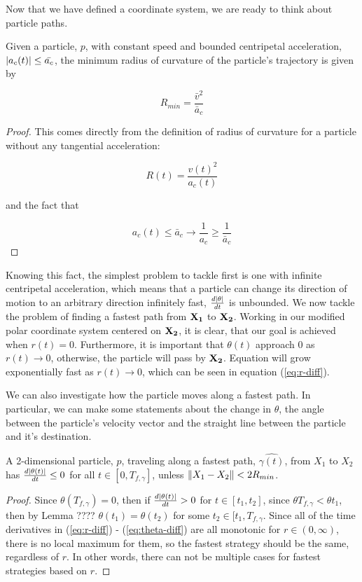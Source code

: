 Now that we have defined a coordinate system, we are ready to think about particle paths.

\begin{lemma}
  Given a particle, $p$, with constant speed and bounded centripetal acceleration, $\abs{a_c(t)} \le \bar{a_c}$, the minimum radius of curvature of the particle's trajectory is given by

  \begin{equation}
    R_{min} = \frac{\bar{v}^2}{\bar{a}_c}
  \end{equation}
  \end{lemma}

\begin{proof}
This comes directly from the definition of radius of curvature for a particle without any tangential acceleration:

\[
  R(t) = \frac{v(t)^2}{a_c(t)}
\]

and the fact that 

\[
  a_c(t) \le \bar{a}_c \to \frac{1}{a_c} \ge \frac{1}{\bar{a}_c}
\]
\end{proof}

Knowing this fact, the simplest problem to tackle first is one with infinite centripetal acceleration, which means that a particle can change its direction of motion to an arbitrary direction infinitely fast, $\frac{d\abs{\theta}}{dt}$ is unbounded. We now tackle the problem of finding a fastest path from $\mathbf{X_1}$ to $\mathbf{X_2}$. Working in our modified polar coordinate system centered on $\mathbf{X_2}$, it is clear, that our goal is achieved when $r(t) = 0$. Furthermore, it is important that $\theta(t)$ approach $0$ as $r(t) \to 0$, otherwise, the particle will pass by $\mathbf{X_2}$. Equation will grow exponentially fast as $r(t) \to 0$, which can be seen in equation (\ref{eq:r-diff}).

We can also investigate how the particle moves along a fastest path. In particular, we can make some statements about the change in $\theta$, the angle between the particle's velocity vector and the straight line between the particle and it's destination.

\begin{theorem}
A 2-dimensional particle, $p$, traveling along a fastest path, $\hat{\gamma(t)}$, from $X_1$ to $X_2$ has $\frac{d\abs{\theta(t)}}{dt} \leq 0$ for all $t \in [0, T_{f, \gamma}]$, unless $\norm{X_1 - X_2} < 2 R_{min}$.
\end{theorem}

\begin{proof}
Since $\theta(T_{f,\gamma}) = 0$, then if $\frac{d\abs{\theta(t)}}{dt} > 0$ for $t \in [t_1, t_2]$, since $\theta{T_{f,\gamma}} < \theta{t_1}$, then by Lemma ???? $\theta(t_1) = \theta(t_2)$ for some $t_2 \in [t_1, T_{f, \gamma}$. Since all of the time derivatives in (\ref{eq:r-diff}) - (\ref{eq:theta-diff}) are all monotonic for $r \in (0, \infty)$, there is no local maximum for them, so the fastest strategy should be the same, regardless of $r$. In other words, there can not be multiple cases for fastest strategies based on $r$.
\end{proof}

